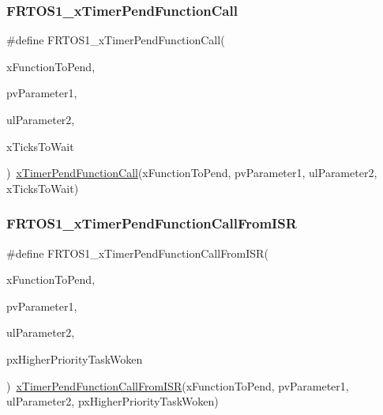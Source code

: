 \subsubsection{\texorpdfstring{F\+R\+T\+O\+S1\+\_\+x\+Timer\+Pend\+Function\+Call}{FRTOS1\_xTimerPendFunctionCall}}
{\footnotesize\ttfamily \#define F\+R\+T\+O\+S1\+\_\+x\+Timer\+Pend\+Function\+Call(\begin{DoxyParamCaption}\item[{}]{x\+Function\+To\+Pend,  }\item[{}]{pv\+Parameter1,  }\item[{}]{ul\+Parameter2,  }\item[{}]{x\+Ticks\+To\+Wait }\end{DoxyParamCaption})~\hyperlink{timers_8h_a04e031135bd3276caaedd656d464dc23}{x\+Timer\+Pend\+Function\+Call}(x\+Function\+To\+Pend, pv\+Parameter1, ul\+Parameter2, x\+Ticks\+To\+Wait)}

\mbox{\label{group___f_r_t_o_s1__module_ga4363dc4e6778d35b6690ccd1b00360f4}} 
\subsubsection{\texorpdfstring{F\+R\+T\+O\+S1\+\_\+x\+Timer\+Pend\+Function\+Call\+From\+I\+SR}{FRTOS1\_xTimerPendFunctionCallFromISR}}
{\footnotesize\ttfamily \#define F\+R\+T\+O\+S1\+\_\+x\+Timer\+Pend\+Function\+Call\+From\+I\+SR(\begin{DoxyParamCaption}\item[{}]{x\+Function\+To\+Pend,  }\item[{}]{pv\+Parameter1,  }\item[{}]{ul\+Parameter2,  }\item[{}]{px\+Higher\+Priority\+Task\+Woken }\end{DoxyParamCaption})~\hyperlink{timers_8h_ae0d9338933037e6feebe6437763fa299}{x\+Timer\+Pend\+Function\+Call\+From\+I\+SR}(x\+Function\+To\+Pend, pv\+Parameter1, ul\+Parameter2, px\+Higher\+Priority\+Task\+Woken)}

